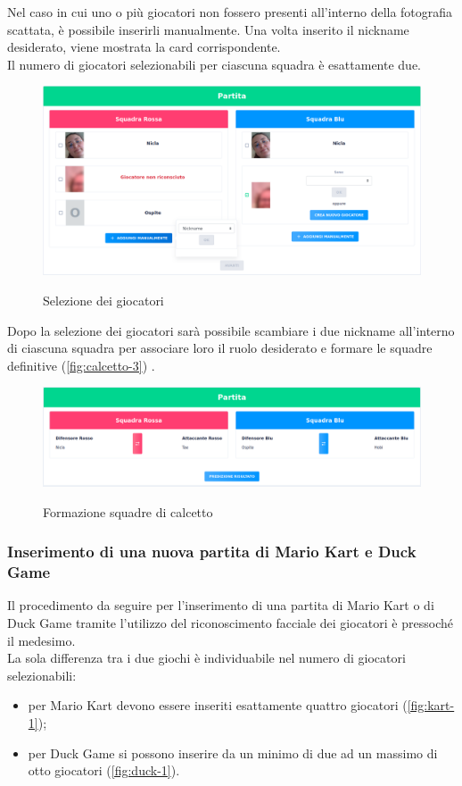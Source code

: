 		\noindent Nel caso in cui uno o più giocatori non fossero presenti all'interno della fotografia scattata, è possibile inserirli manualmente. Una volta inserito il nickname desiderato, viene mostrata la card corrispondente. \\
		Il numero di giocatori selezionabili per ciascuna squadra è esattamente due. 
		
		\begin{figure}[H]
			\centering
			\includegraphics[width=\textwidth]{immagini/calcetto-2.png} \\
			\caption{\label{fig:calcetto-2} Selezione dei giocatori}
		\end{figure}
		
		\noindent Dopo la selezione dei giocatori sarà possibile scambiare i due nickname all'interno di ciascuna squadra per associare loro il ruolo desiderato e formare le squadre definitive (\autoref{fig:calcetto-3}) .
			
		\begin{figure}[H]
			\centering
			\includegraphics[width=\textwidth]{immagini/calcetto-3.png} \\
			\caption{\label{fig:calcetto-3} Formazione squadre di calcetto}
		\end{figure}
		
		
		\subsubsection{Inserimento di una nuova partita di Mario Kart e Duck Game}
		Il procedimento da seguire per l'inserimento di una partita di Mario Kart o di Duck Game tramite l'utilizzo del riconoscimento facciale dei giocatori è pressoché il medesimo. \\
		La sola differenza tra i due giochi è individuabile nel numero di giocatori selezionabili: 
		\begin{itemize}
			\item per Mario Kart devono essere inseriti esattamente quattro giocatori (\autoref{fig:kart-1});
			\item per Duck Game si possono inserire da un minimo di due ad un massimo di otto giocatori (\autoref{fig:duck-1}).
		\end{itemize}
	
